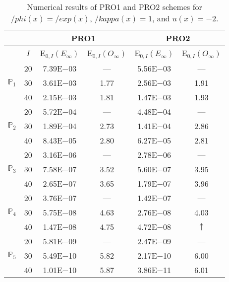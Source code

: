 \begin{table}[H]
\caption{Numerical results of PRO1 and PRO2 schemes for $/phi(x)=/exp(x)$, $/kappa(x)=1$, and $u(x)=-2$.}
\setlength{\tabcolsep}{5pt}
\centering
\begin{tabular}{@{}l c c c c c@{}}
\toprule
 &  & \multicolumn{2}{c}{PRO1} & \multicolumn{2}{c}{PRO2}\\
\midrule
 & $I$ & E$_{0,I}(E_{\infty})$ & E$_{0,I}(O_{\infty})$ & E$_{0,I}(E_{\infty})$ & E$_{0,I}(O_{\infty})$\\
\midrule
\multirow{3}{*}{$\mathbb{P}_{1}$}
 & 20 & 7.39E$-$03 & --- & 5.56E$-$03 & ---\\
 & 30 & 3.61E$-$03 & 1.77 & 2.56E$-$03 & 1.91 \\
 & 40 & 2.15E$-$03 & 1.81 & 1.47E$-$03 & 1.93 \\
\midrule
\multirow{3}{*}{$\mathbb{P}_{2}$}
 & 20 & 5.72E$-$04 & --- & 4.48E$-$04 & ---\\
 & 30 & 1.89E$-$04 & 2.73 & 1.41E$-$04 & 2.86 \\
 & 40 & 8.43E$-$05 & 2.80 & 6.27E$-$05 & 2.81 \\
\midrule
\multirow{3}{*}{$\mathbb{P}_{3}$}
 & 20 & 3.16E$-$06 & --- & 2.78E$-$06 & ---\\
 & 30 & 7.58E$-$07 & 3.52 & 5.60E$-$07 & 3.95 \\
 & 40 & 2.65E$-$07 & 3.65 & 1.79E$-$07 & 3.96 \\
\midrule
\multirow{3}{*}{$\mathbb{P}_{4}$}
 & 20 & 3.76E$-$07 & --- & 1.42E$-$07 & ---\\
 & 30 & 5.75E$-$08 & 4.63 & 2.76E$-$08 & 4.03 \\
 & 40 & 1.47E$-$08 & 4.75 & 4.72E$-$08 & $\uparrow$ \\
\midrule
\multirow{3}{*}{$\mathbb{P}_{5}$}
 & 20 & 5.81E$-$09 & --- & 2.47E$-$09 & ---\\
 & 30 & 5.49E$-$10 & 5.82 & 2.17E$-$10 & 6.00 \\
 & 40 & 1.01E$-$10 & 5.87 & 3.86E$-$11 & 6.01 \\
\bottomrule
\end{tabular}
\label{Table:PRO:Test2}
\end{table}
